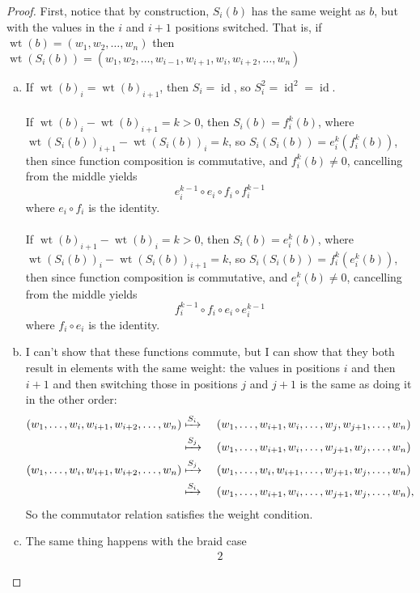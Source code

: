\documentclass{article}
\newcommand{\wt}{\operatorname{wt}}
\newcommand{\id}{\operatorname{id}}
\begin{document}
\begin{proof} First, notice that by construction, $S_i(b)$ has the same weight
  as $b$, but with the values in the $i$ and $i+1$ positions switched. That is,
  if $\wt(b) = (w_1, w_2, \hdots, w_n)$ then
  $\wt(S_i(b)) = (w_1, w_2, \hdots, w_{i-1}, w_{i+1}, w_i, w_{i+2}, \hdots, w_n)$
  \begin{enumerate}[(a)]
    \item If $\wt(b)_i = \wt(b)_{i+1}$, then $S_i = \id$, so $S_i^2 = \id^2 = \id$.
    \\~\\
    If $\wt(b)_i - \wt(b)_{i+1} = k > 0$, then
    $S_i(b) = f_i^k(b)$, where $\wt(S_i(b))_{i+1} - \wt(S_i(b))_i = k$, so
    $S_i(S_i(b)) = e_i^k(f_i^k(b))$, then since function composition is
    commutative, and $f_i^k(b) \neq 0$, cancelling from the middle yields \[
      e_i^{k-1}\circ  e_i \circ  f_i \circ f_i^{k-1}
    \] where $e_i \circ f_i$ is the identity.
    \\~\\
    If $\wt(b)_{i+1} - \wt(b)_{i} = k > 0$, then
    $S_i(b) = e_i^k(b)$, where $\wt(S_i(b))_i - \wt(S_i(b))_{i+1} = k$, so
    $S_i(S_i(b)) = f_i^k(e_i^k(b))$, then since function composition is
    commutative, and $e_i^k(b) \neq 0$, cancelling from the middle yields \[
      f_i^{k-1}\circ f_i \circ  e_i \circ e_i^{k-1}
    \] where $f_i \circ e_i$ is the identity.
    \item I can't show that these functions commute, but I can show that they
    both result in elements with the same weight: the values in positions $i$ and
    then $i+1$ and then switching those in positions $j$ and $j+1$ is the same
    as doing it in the other order: \begin{alignat*}{2}
      (w_1, \hdots, w_i, w_{i+1}, w_{i+2}, \hdots, w_n)
      &\xmapsto{S_i}     &&\ (w_1, \hdots, w_{i+1}, w_i, \hdots, w_{j}, w_{j+1}, \hdots, w_n) \\
      &\xmapsto{S_j}     &&\ (w_1, \hdots, w_{i+1}, w_i, \hdots, w_{j+1}, w_{j}, \hdots, w_n) \\
      (w_1, \hdots, w_i, w_{i+1}, w_{i+2}, \hdots, w_n)
      &\xmapsto{S_{j}}   &&\ (w_1, \hdots, w_{i}, w_{i+1}, \hdots, w_{j+1}, w_{j}, \hdots, w_n) \\
      &\xmapsto{S_{i}}   &&\ (w_1, \hdots, w_{i+1}, w_i, \hdots, w_{j+1}, w_{j}, \hdots, w_n),
    \end{alignat*}
    So the commutator relation satisfies the weight condition.
    \item The same thing happens with the braid case \begin{alignat*}{2}

\end{alignat*}
\end{enumerate}
\end{proof}
\end{document}
